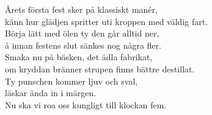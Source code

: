 \documentclass[a6paper, 10pt, twoside]{article}
\begin{document}
\noindent
\begin{center}
\end{center}
\begin{lyrics}
Årets första fest sker på klassiskt manér,\\
känn hur glädjen spritter uti kroppen med väldig fart.\\
Börja lätt med ölen ty den går alltid ner,\\
å innan festens slut sänkes nog några fler.
\vspace{5pt}\\
Smaka nu på bäsken, det ädla fabrikat,\\
om kryddan bränner strupen finns bättre destillat.\\
Ty punschen kommer ljuv och sval,\\
läskar ända in i märgen.\\
Nu ska vi roa oss kungligt till klockan fem.
\end{lyrics}
\begin{center}
\end{center}
\end{document}

